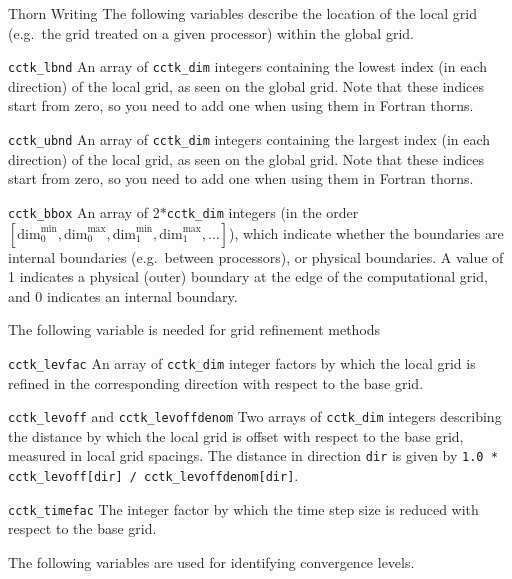 \begin{cactuspart}{Thorn Writing}
The following variables describe the location of the local
grid (e.g.\ the grid treated on a given processor) within
the global grid.
\begin{Lentry}
\item [\texttt{cctk\_lbnd}]
      An array of \texttt{cctk\_dim} integers
      containing the lowest index (in each direction)
      of the local grid, as seen on the global grid. Note that these indices
      start from zero, so you need to add one when using them in
      Fortran thorns.
\item [\texttt{cctk\_ubnd}]
      An array of \texttt{cctk\_dim} integers
      containing the largest index (in each direction)
      of the local grid, as seen on the global grid.  Note that these indices
      start from zero, so you need to add one when using them in
      Fortran thorns.
\item [\texttt{cctk\_bbox}]
      An array of 2$*$\texttt{cctk\_dim} integers (in the order
        $[\mbox{dim}_0^{\mbox{min}}, \mbox{dim}_0^{\mbox{max}},
        \mbox{dim}_1^{\mbox{min}}, \mbox{dim}_1^{\mbox{max}}, \ldots]$),
      which indicate whether the boundaries are internal boundaries
      (e.g.\ between processors), or physical boundaries.
      A value of 1 indicates
      a physical (outer) boundary at the edge of the computational grid,
      and 0 indicates an internal boundary.
\end{Lentry}

The following variable is needed for grid refinement methods
\begin{Lentry}
\item [\texttt{cctk\_levfac}] An array of \texttt{cctk\_dim} integer factors
        by which the local grid is refined in the corresponding
        direction with respect to the base grid.
\item [\texttt{cctk\_levoff}] and \texttt{cctk\_levoffdenom} Two arrays of
        \texttt{cctk\_dim} integers describing the distance by which the
        local grid is offset with respect to the base grid, measured
        in local grid spacings.  The distance in direction \texttt{dir}
        is given by \texttt{1.0 * cctk\_levoff[dir] /
        cctk\_levoffdenom[dir]}.
\item [\texttt{cctk\_timefac}] The integer factor
        by which the time step size is reduced with respect to the
        base grid.
\end{Lentry}

The following variables are used for identifying convergence levels.


\end{cactuspart}
